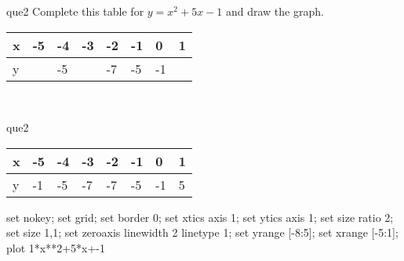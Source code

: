 \documentclass[13.5pt, varwidth=true]{beamer}
\begin{document}
\begin{frame}[shrink=19,fragile]
	\begin{beamercolorbox}[rounded=true, left, shadow=true,wd=14.8cm]{que2}
		 Complete this table for $y = x^{2} + 5x - 1$ and draw the graph. \\[0.3cm] \renewcommand{\arraystretch}{1.2}\begin{tabular}{|C|C|C|C|C|C|C|C|} \hline x & -5 & -4 & -3 & -2 & -1 & 0 & 1 \\ \hline y &  & -5 &  & -7 & -5 & -1 & \\ \hline \end{tabular}\\[0.3cm]
	\end{beamercolorbox}
\end{frame}
\begin{frame}[shrink=19,fragile]
	\begin{beamercolorbox}[rounded=true, left, shadow=true,wd=14.8cm]{que2}
		\renewcommand{\arraystretch}{1.2}\begin{tabular}{|C|C|C|C|C|C|C|C|} \hline x & -5 & -4 & -3 & -2 & -1 & 0 & 1 \\ \hline y & -1 & -5 & -7 & -7 & -5 & -1 & 5\\ \hline \end{tabular}\begin{gnuplot}[terminal=pdf] set nokey; set grid; set border 0; set xtics axis 1; set ytics axis 1; set size ratio 2; set size 1,1; set zeroaxis linewidth 2 linetype 1; set yrange [-8:5]; set xrange [-5:1]; plot 1*x**2+5*x+-1 \end{gnuplot}
	\end{beamercolorbox}
\end{frame}
\end{document}
